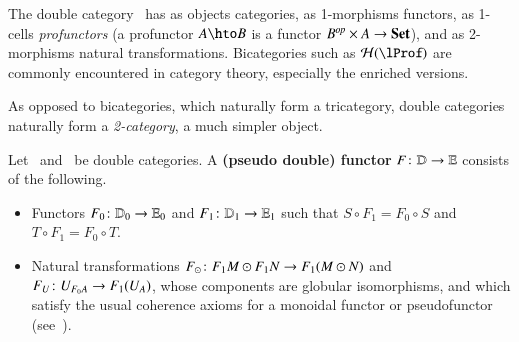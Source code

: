 \begin{eg}
  The double category \lProf\ has as objects categories, as
  1-morphisms functors, as 1-cells \emph{profunctors} (a profunctor
  $A\hto B$ is a functor $B^{\mathit{op}}\times A\to \mathbf{Set}$), and as
  2-morphisms natural transformations.  Bicategories such as
  $\cH(\lProf)$ are commonly encountered in category theory,
  especially the enriched versions.
\end{eg}


As opposed to bicategories, which naturally form a tricategory, double
categories naturally form a \emph{2-category}, a much simpler object.

\begin{defn}
  Let \lD\ and \lE\ be double categories.  A \textbf{(pseudo double)
    functor} $F\colon \mathbb{D}\to \mathbb{E}$ consists of the following.
  \begin{itemize}
  \item Functors $F_0\colon \mathbb{D}_0 \to \mathbb{E}_0$ and $F_1\colon \mathbb{D}_1 \to
    \mathbb{E}_1$ such that $S\circ F_1 = F_0\circ S$ and $T\circ F_1 =
    F_0\circ T$.
  \item Natural transformations $F_\odot\colon F_1M \odot F_1N \to
    F_1(M\odot N)$ and $F_U\colon U_{F_0 A} \to F_1(U_A)$, whose
    components are globular isomorphisms, and which satisfy the usual
    coherence axioms for a monoidal functor or pseudofunctor
    (see~\cite[\S{}XI.2]{maclane}).
  \end{itemize}
\end{defn}

